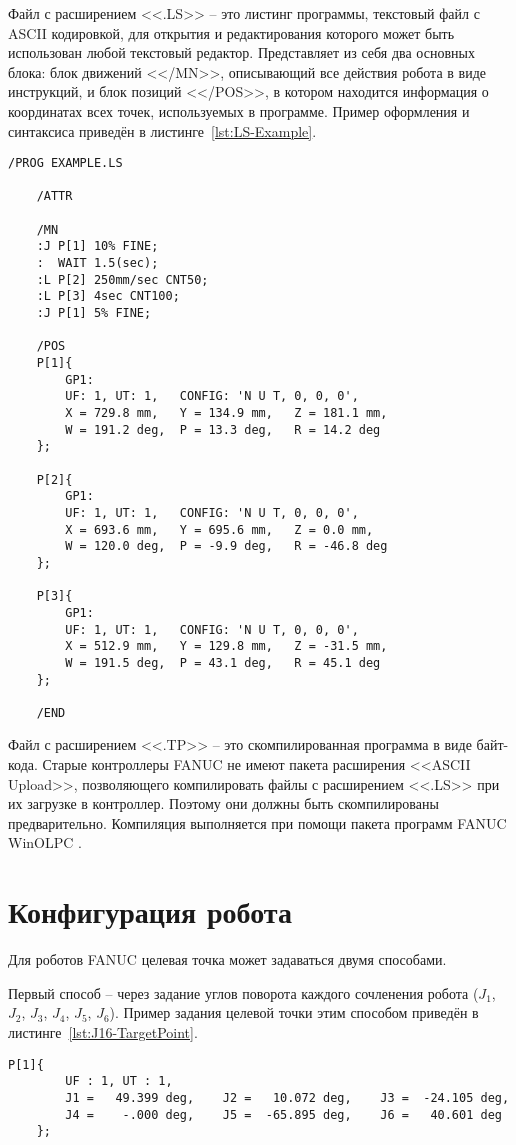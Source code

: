 Файл с расширением <<.LS>> -- это листинг программы, текстовый файл с ASCII кодировкой, для открытия и редактирования которого может быть использован любой текстовый редактор.
Представляет из себя два основных блока: блок движений <</MN>>, описывающий все действия робота в виде инструкций, и блок позиций <</POS>>, в котором находится информация о координатах всех точек, используемых в программе.
Пример оформления и синтаксиса приведён в листинге~\ref{lst:LS-Example}.

\begin{lstlisting}[caption={Пример оформления .LS файлов}, label={lst:LS-Example}]
	/PROG EXAMPLE.LS

	/ATTR

	/MN
	:J P[1] 10% FINE;
	:  WAIT 1.5(sec);
	:L P[2] 250mm/sec CNT50;
	:L P[3] 4sec CNT100;
	:J P[1] 5% FINE;

	/POS
	P[1]{
		GP1:
		UF: 1, UT: 1,	CONFIG: 'N U T, 0, 0, 0',
		X = 729.8 mm,	Y = 134.9 mm,	Z = 181.1 mm,
		W = 191.2 deg,	P = 13.3 deg,	R = 14.2 deg
	};

	P[2]{
		GP1:
		UF: 1, UT: 1,	CONFIG: 'N U T, 0, 0, 0',
		X = 693.6 mm,	Y = 695.6 mm,	Z = 0.0 mm,
		W = 120.0 deg,	P = -9.9 deg,	R = -46.8 deg
	};

	P[3]{
		GP1:
		UF: 1, UT: 1,	CONFIG: 'N U T, 0, 0, 0',
		X = 512.9 mm,	Y = 129.8 mm,	Z = -31.5 mm,
		W = 191.5 deg,	P = 43.1 deg,	R = 45.1 deg
	};

	/END
\end{lstlisting}

Файл с расширением <<.TP>> -- это скомпилированная программа в виде байт-кода.
Старые контроллеры FANUC не имеют пакета расширения <<ASCII Upload>>, позволяющего компилировать файлы с расширением <<.LS>> при их загрузке в контроллер.
Поэтому они должны быть скомпилированы предварительно.
Компиляция выполняется при помощи пакета программ FANUC WinOLPC .


\section{Конфигурация робота} \label{sec:RobotConfiguration}
Для роботов FANUC целевая точка может задаваться двумя способами.

Первый способ -- через задание углов поворота каждого сочленения робота ($J_1$, $J_2$, $J_3$, $J_4$, $J_5$, $J_6$).
Пример задания целевой точки этим способом приведён в листинге~\ref{lst:J16-TargetPoint}.

\begin{lstlisting}[caption={Задание целевой точки с помощью углов J1-J6}, label={lst:J16-TargetPoint}]
	P[1]{
		UF : 1, UT : 1,
		J1 =   49.399 deg,    J2 =   10.072 deg,    J3 =  -24.105 deg,
		J4 =    -.000 deg,    J5 =  -65.895 deg,    J6 =   40.601 deg
	};
\end{lstlisting}

